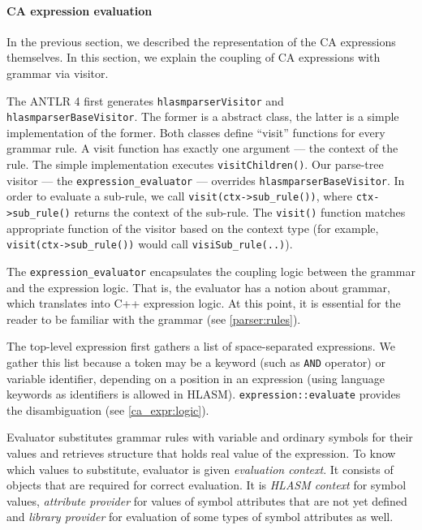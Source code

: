 \paragraph{CA expression evaluation}
\label{ca_expr:eval}

In the previous section, we described the representation of the CA expressions themselves. In this section, we explain the coupling of CA expressions with grammar via visitor. 

The ANTLR 4 first generates \texttt{hlasmparserVisitor} and \texttt{hlasmparserBaseVisitor}. The former is a abstract class, the latter is a simple implementation of the former. Both classes define ``visit'' functions for every grammar rule. A visit function has exactly one argument --- the context of the rule. The simple implementation executes \texttt{visitChildren()}. Our parse-tree visitor --- the \texttt{expression\_evaluator} --- overrides \texttt{hlasmparserBaseVisitor}. In order to evaluate a sub-rule, we call \texttt{visit(ctx->sub\_rule())}, where \texttt{ctx->sub\_rule()} returns the context of the sub-rule. The \texttt{visit()} function matches appropriate function of the visitor based on the context type (for example, \texttt{visit(ctx->sub\_rule())} would call \texttt{visiSub\_rule(..)}).

The \texttt{expression\_evaluator} encapsulates the coupling logic between the grammar and the expression logic. That is, the evaluator has a notion about grammar, which translates into C++ expression logic. At this point, it is essential for the reader to be familiar with the grammar (see \cref{parser:rules}).

The top-level expression first gathers a list of space-separated expressions. We gather this list because a token may be a keyword (such as \texttt{AND} operator) or variable identifier, depending on a position in an expression (using language keywords as identifiers is allowed in HLASM). \texttt{expression::evaluate} provides the disambiguation (see \cref{ca_expr:logic}). 

Evaluator substitutes grammar rules with variable and ordinary symbols for their values and retrieves structure that holds real value of the expression. To know which values to substitute, evaluator is given \emph{evaluation context}. It consists of objects that are required for correct evaluation. It is \emph{HLASM context} for symbol values, \emph{attribute provider} for values of symbol attributes that are not yet defined and \emph{library provider} for evaluation of some types of symbol attributes as well.

